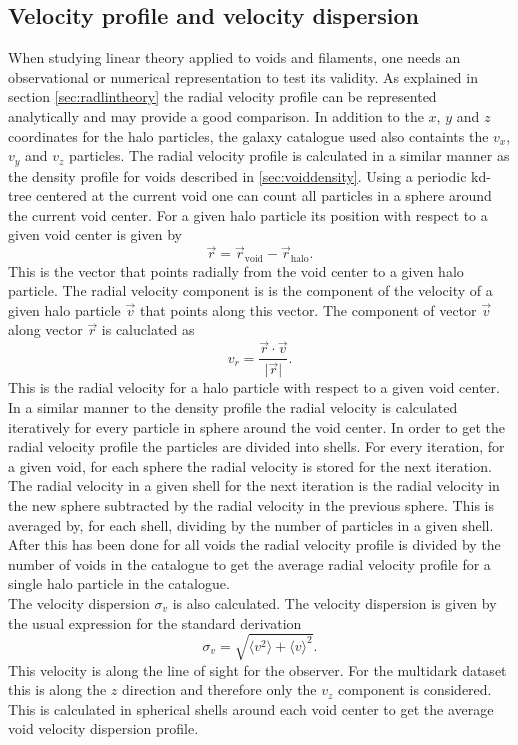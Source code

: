 \subsection{Velocity profile and velocity dispersion}
When studying linear theory applied to voids and filaments, one needs an observational or
numerical representation to test its validity. As explained in section
\ref{sec:radlintheory} the radial velocity profile can be represented analytically and
may provide a good comparison. In addition to the $x$, $y$ and $z$ coordinates for the
halo particles, the galaxy catalogue used also containts the $v_x$, $v_y$ and
$v_z$ particles. The radial velocity profile is calculated in a
similar manner as the density profile for voids described in
\ref{sec:voiddensity}. Using a periodic kd-tree centered at the current void one
can count all particles in a sphere around the current void center. For a given
halo particle its position with respect to a given void center is given by
\begin{equation}\label{eq:voidpos}
    \vec{r}=\vec{r}_{\mathrm{void}}-\vec{r}_{\mathrm{halo}}.
\end{equation}
This is the vector that points radially from the void center to a given halo
particle. The radial velocity component is is the component of the velocity of a
given halo particle $\vec{v}$ that points along this vector. The component of vector
$\vec{v}$ along vector $\vec{r}$ is caluclated as
\begin{equation}
    v_r=\frac{\vec{r}\cdot\vec{v}}{\vert\vec{r}\vert}.
\end{equation}
This is the radial velocity for a halo particle with respect to a given void
center. In a similar manner to the density profile the radial velocity is
calculated iteratively for every particle in sphere around the void center. In
order to get the radial velocity profile the particles are divided into
shells. For every iteration, for a given void, for each sphere the radial
velocity is stored for the next iteration. The radial velocity in a given shell
for the next iteration is the radial velocity in the new sphere subtracted by
the radial velocity in the previous sphere. This is averaged by, for each shell,
dividing by the number of particles in a given shell. After this has
been done for all voids the radial velocity profile is divided by the number of voids in the catalogue to get
the average radial velocity profile for a single halo particle in the catalogue.
\\\indent
The velocity dispersion $\sigma_v$ is also calculated. The velocity dispersion
is given by the usual expression for the standard derivation
\begin{equation}
    \sigma_{v} = \sqrt{\langle v^2 \rangle + \langle v\rangle^2}.
\end{equation}
This velocity is along the line of sight for the observer. For the multidark
dataset this is along the $z$ direction and therefore only the $v_z$ component
is considered. This is calculated in spherical shells around each void center to
get the average void velocity dispersion profile.
